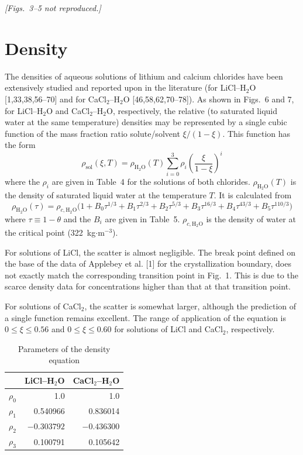 \documentclass[11pt]{article}
\begin{document}
\textit{[Figs.~3--5 not reproduced.]}

\section{Density}

The densities of aqueous solutions of lithium and calcium chlorides have been extensively
studied and reported upon in the literature (for LiCl--H$_2$O [1,33,38,56--70] and for
CaCl$_2$--H$_2$O [46,58,62,70--78]). As shown in Figs.~6 and 7, for LiCl--H$_2$O and
CaCl$_2$--H$_2$O, respectively, the relative (to saturated liquid water at the same
temperature) densities may be represented by a single cubic function of the mass fraction
ratio solute/solvent $\xi/(1-\xi)$. This function has the form
\begin{equation}
\rho_{\mathrm{sol}}(\xi, T) = \rho_{\mathrm{H_2O}}(T) \sum_{i=0}^{3} \rho_i
\left(\frac{\xi}{1-\xi}\right)^i
\end{equation}
where the $\rho_i$ are given in Table~4 for the solutions of both chlorides.
$\rho_{\mathrm{H_2O}}(T)$ is the density of saturated liquid water at the temperature $T$.
It is calculated from
\begin{equation}
\rho_{\mathrm{H_2O}}(\tau) = \rho_{c,\mathrm{H_2O}} \Big(1 + B_0 \tau^{1/3} + B_1
\tau^{2/3} + B_2 \tau^{5/3} + B_3 \tau^{16/3} + B_4 \tau^{43/3} + B_5 \tau^{110/3}\Big)
\end{equation}
where $\tau \equiv 1 - \theta$ and the $B_i$ are given in Table~5. $\rho_{c,\mathrm{H_2O}}$
is the density of water at the critical point (322~kg$\cdot$m$^{-3}$).

For solutions of LiCl, the scatter is almost negligible. The break point defined on the
base of the data of Applebey et al. [1] for the crystallization boundary, does not exactly
match the corresponding transition point in Fig.~1. This is due to the scarce density data
for concentrations higher than that at that transition point.

For solutions of CaCl$_2$, the scatter is somewhat larger, although the prediction of a
single function remains excellent. The range of application of the equation is
$0 \le \xi \le 0.56$ and $0 \le \xi \le 0.60$ for solutions of LiCl and CaCl$_2$,
respectively.

\begin{table}[htbp]
\centering
\caption{Parameters of the density equation}
\begin{tabular}{lrr}
\toprule
 & LiCl--H$_2$O & CaCl$_2$--H$_2$O \\
\midrule
$\rho_0$ & 1.0 & 1.0 \\
$\rho_1$ & 0.540966 & 0.836014 \\
$\rho_2$ & $-0.303792$ & $-0.436300$ \\
$\rho_3$ & 0.100791 & 0.105642 \\
\bottomrule
\end{tabular}
\end{table}
\end{document}
